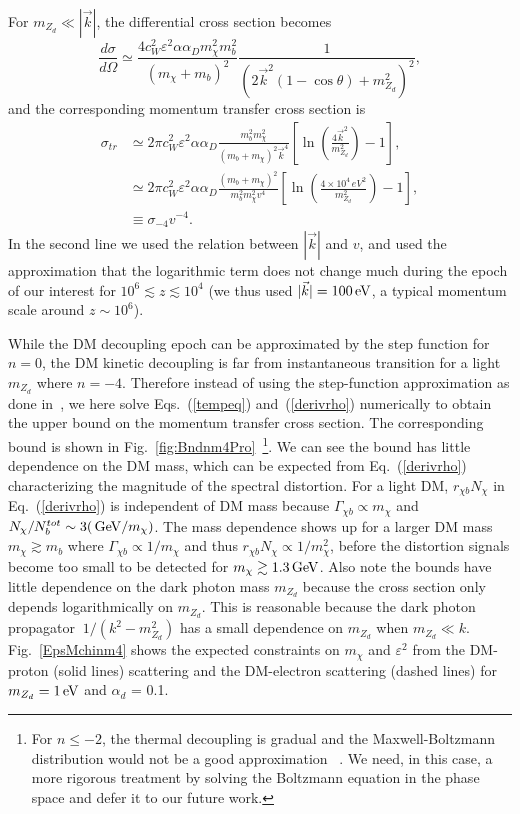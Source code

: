 \documentclass[5p,times]{elsarticle}
\newcommand{\dis}[1]{\begin{equation}\begin{split}#1\end{split}\end{equation}}
\newcommand{\eq}[1]{Eq.~(\ref{#1})}
\newcommand\gev{\,{\rm GeV}}
\newcommand\ev{\,{\rm eV}}
\begin{document}
{For $m_{Z_d}\ll |\vec{k}|$,  the differential cross section becomes
\begin{equation}
 \frac{d\sigma}{d\Omega}\simeq\frac{4c_W^2\varepsilon^2\alpha\alpha_Dm_\chi^2 m_b^2}{(m_\chi+m_b)^2}\frac{1}{(2\vec{k}^2(1-\cos\theta)+m_{Z_d}^2)^2} ,
 \end{equation}
and the corresponding momentum transfer cross section is
\dis{
\sigma_{tr}&\simeq2\pi c_W^2\varepsilon^2\alpha\alpha_D\frac{m_b^2m_\chi^2}{(m_b+m_\chi)^2\vec{k}^4}\left[\ln{\left(\frac{4\vec{k}^2}{m_{Z_d}^2}\right)}-1\right],\\
&\simeq 2\pi c_W^2\varepsilon^2\alpha\alpha_D\frac{(m_b+m_\chi)^2}{m_b^2m_\chi^2v^4}\left[\ln{\left(\frac{4\times10^4\, eV^2}{m_{Z_d}^2}\right)}-1\right],\\
&\equiv \sigma_{-4} v^{-4}.
\label{eq:largek}
}
In the second line we used the relation between $|\vec{k}|$ and $v$, and used the approximation that the logarithmic term does not change much during the epoch of our interest for $10^6\lesssim z\lesssim 10^4$ (we thus used $|\vec{k}|=100 \ev$, a typical momentum scale around $z\sim 10^6$). 


While the DM decoupling epoch can be approximated by the step function for $n=0$,  the DM kinetic decoupling is far from instantaneous transition for a light $m_{Z_d}$ where $n=-4$. Therefore instead of using the step-function approximation as done in~\cite{Ali-Haimoud:2015pwa}, we here solve Eqs.~(\ref{tempeq}) and~(\ref{derivrho}) numerically to obtain the upper bound on the momentum transfer cross section.  The corresponding bound is shown in Fig.~\ref{fig:Bndnm4Pro}~\footnote{For $n\leq -2$, the thermal decoupling is gradual and the Maxwell-Boltzmann distribution would not be a good approximation ~\cite{Ali-Haimoud:2015pwa}. We need, in this case, a more rigorous treatment by solving the Boltzmann equation in the phase space and defer it to our future work.}. We can see the bound has little dependence on the DM mass, which can be expected from  \eq{derivrho} characterizing the magnitude of the spectral distortion. For a light DM, $r_{\chi b} N_\chi$ in \eq{derivrho} is independent of DM mass because $\Gamma_{\chi b} \propto m_\chi$ and $N_\chi/N^{tot}_b \sim 3(\gev/m_\chi) $. The mass dependence shows up for a larger DM mass $m_\chi \gtrsim m_b$ where $\Gamma_{\chi b} \propto 1/m_\chi$ and thus $r_{\chi b} N_\chi \propto 1/m_\chi^2$, before the distortion signals become too small to be detected for $m_\chi \gtrsim  1.3 \gev$. Also note the bounds have little dependence on the dark photon mass $m_{Z_d}$ because the cross section only depends logarithmically on $m_{Z_d}$. This is reasonable because the dark photon propagator $~1/(k^2-m_{Z_d}^2)$ has a small dependence on  $m_{Z_d}$ when $m_{Z_d}\ll k$.
Fig.~\ref{EpsMchinm4} shows the expected constraints on $m_\chi$ and $\varepsilon^2$ from the DM-proton (solid lines) scattering and the DM-electron scattering (dashed lines) for $m_{Z_d}= 1\ev$ and $\alpha_d$ = 0.1.



}
\end{document}
